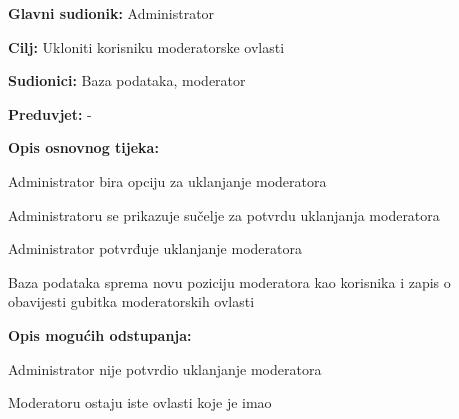 \noindent {}
\begin{packed_item}

\item \textbf{Glavni sudionik:} Administrator
\item  \textbf{Cilj:} Ukloniti korisniku moderatorske ovlasti
\item  \textbf{Sudionici:} Baza podataka, moderator
\item  \textbf{Preduvjet:} -
\item  \textbf{Opis osnovnog tijeka:}

\item[] \begin{packed_enum}

    \item Administrator bira opciju za uklanjanje moderatora
    \item Administratoru se prikazuje sučelje za potvrdu uklanjanja moderatora
    \item Administrator potvrđuje uklanjanje moderatora
    \item Baza podataka sprema novu poziciju moderatora kao korisnika i zapis o obavijesti gubitka moderatorskih ovlasti

\end{packed_enum}

\item  \textbf{Opis mogućih odstupanja:}

\item[] \begin{packed_item}

    \item[3.a] Administrator nije potvrdio uklanjanje moderatora
    \item[] \begin{packed_enum}

        \item Moderatoru ostaju iste ovlasti koje je imao

    \end{packed_enum}

\end{packed_item}
\end{packed_item}

